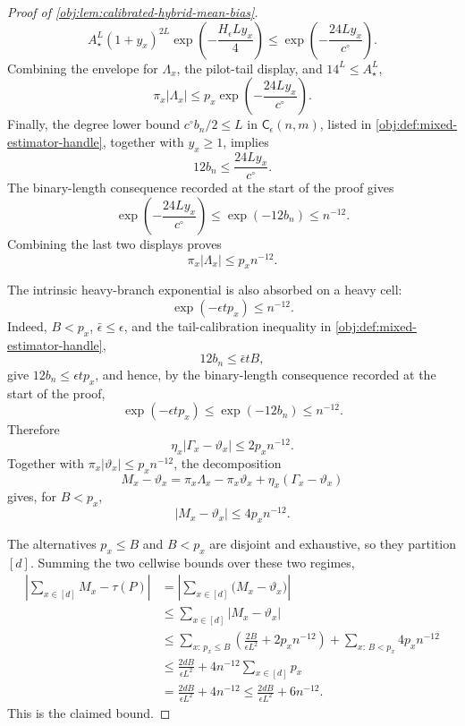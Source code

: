 \begin{proof}[Proof of \cref{obj:lem:calibrated-hybrid-mean-bias}]
\[
A_\star^L(1+y_x)^{2L}
\exp\!\left(-\frac{H_\epsilon Ly_x}{4}\right)
\le
\exp\!\left(-\frac{24Ly_x}{c^\circ}\right).
\]
Combining the envelope for \(\Lambda_x\), the pilot-tail display, and \(14^L\le A_\star^L\),
\[
\pi_x|\Lambda_x|
\le
p_x\exp\!\left(-\frac{24Ly_x}{c^\circ}\right).
\]
Finally, the degree lower bound \(c^\circ b_n/2\le L\) in \(\mathsf C_\epsilon(n,m)\), listed in \cref{obj:def:mixed-estimator-handle}, together with \(y_x\ge1\), implies
\[
12b_n\le \frac{24Ly_x}{c^\circ}.
\]
The binary-length consequence recorded at the start of the proof gives
\[
\exp\!\left(-\frac{24Ly_x}{c^\circ}\right)
\le
\exp(-12b_n)
\le
n^{-12}.
\]
Combining the last two displays proves
\[
\pi_x|\Lambda_x|\le p_xn^{-12}.
\]

The intrinsic heavy-branch exponential is also absorbed on a heavy cell:
\[
\exp(-\epsilon t p_x)
\le
n^{-12}.
\]
Indeed, \(B<p_x\), \(\bar\epsilon\le\epsilon\), and the tail-calibration inequality in \cref{obj:def:mixed-estimator-handle},
\[
12b_n\le \bar\epsilon tB,
\]
give \(12b_n\le \epsilon t p_x\), and hence, by the binary-length consequence recorded at the start of the proof,
\[
\exp(-\epsilon t p_x)\le \exp(-12b_n)\le n^{-12}.
\]
Therefore
\[
\eta_x|\Gamma_x-\vartheta_x|
\le
2p_xn^{-12}.
\]
Together with \(\pi_x|\vartheta_x|\le p_xn^{-12}\), the decomposition
\[
M_x-\vartheta_x
=
\pi_x\Lambda_x-\pi_x\vartheta_x+\eta_x(\Gamma_x-\vartheta_x)
\]
gives, for \(B<p_x\),
\[
|M_x-\vartheta_x|
\le
4p_xn^{-12}.
\]

The alternatives \(p_x\le B\) and \(B<p_x\) are disjoint and exhaustive, so
they partition \([d]\).  Summing the two cellwise bounds over these two regimes,
\[
\begin{aligned}
\left|
\sum_{x\in[d]}M_x-\tau(P)
\right|
&=
\left|
\sum_{x\in[d]}\bigl(M_x-\vartheta_x\bigr)
\right|  \\
&\le
\sum_{x\in[d]}
\left|M_x-\vartheta_x\right| \\
&\le
\sum_{x:\,p_x\le B}
\left(\frac{2B}{\epsilon L^2}+2p_xn^{-12}\right)
+
\sum_{x:\,B<p_x}4p_xn^{-12} \\
&\le
\frac{2dB}{\epsilon L^2}
+4n^{-12}\sum_{x\in[d]}p_x \\
&=
\frac{2dB}{\epsilon L^2}+4n^{-12}
\le
\frac{2dB}{\epsilon L^2}+6n^{-12}.
\end{aligned}
\]
This is the claimed bound. %
\end{proof}
